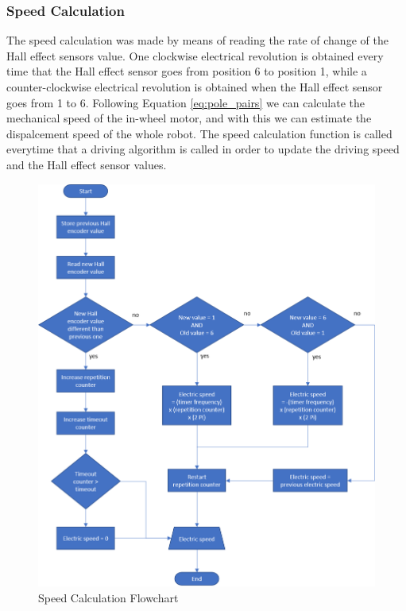 \subsubsection{Speed Calculation}

The speed calculation was made by means of reading the rate of change of the Hall effect sensors value. One clockwise electrical revolution is obtained every time that the Hall effect sensor goes from position 6 to position 1, while a counter-clockwise electrical revolution is obtained when the Hall effect sensor goes from 1 to 6. Following Equation \ref{eq:pole_pairs} we can calculate the mechanical speed of the in-wheel motor, and with this we can estimate the dispalcement speed of the whole robot. The speed calculation function is called everytime that a driving algorithm is called in order to update the driving speed and the Hall effect sensor values.

\vfill
\begin{figure}[htbp]
\centering
\includegraphics[width=\textwidth]{Images/flowcharts/speed_calculation.png} 
\caption[Speed Calculation Flowchart]{Speed Calculation Flowchart}
\label{fig:speed_flow}
\end{figure}
\vfill
\clearpage

